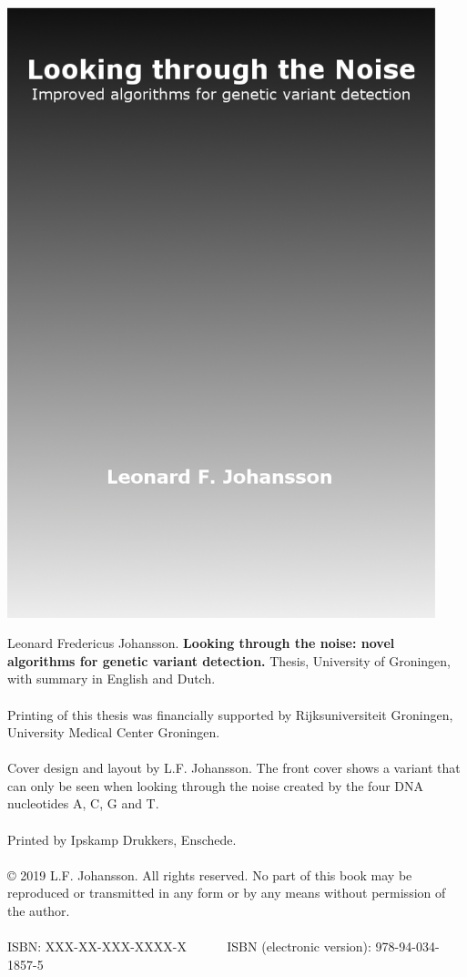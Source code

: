 \clearpage
{}
\includegraphics[width=0.935\textwidth,height=1.0\textheight]{img/frontcover_zw}
\restoregeometry
\clearpage

{\small
	\noindent
	Leonard Fredericus Johansson. \textbf{Looking through the noise: novel algorithms for genetic variant detection.} Thesis, University of Groningen, with summary in English and Dutch.
	\\~\\
	Printing of this thesis was financially supported by Rijksuniversiteit Groningen, University Medical Center Groningen. 
	\\~\\
	Cover design and layout by L.F. Johansson.
	The front cover shows a variant that can only be seen when looking through the noise created by the four DNA nucleotides A, C, G and T. 
	\\~\\
	Printed by Ipskamp Drukkers, Enschede.\\
	\\
	© 2019 L.F. Johansson. All rights reserved. No part of this book may be reproduced or transmitted in any form or by any means without permission of the author.\\
	\\
	ISBN: XXX-XX-XXX-XXXX-X \mbox{~~~~~} ISBN (electronic version): 978-94-034-1857-5
}

